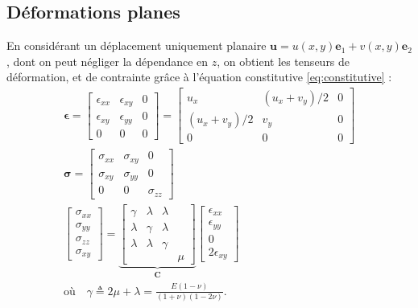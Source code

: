 \documentclass[12pt]{article}
\newcommand{\uu}{\mathbf{u}}
\newcommand{\stress}{\boldsymbol{\sigma}}
\newcommand{\strain}{\boldsymbol{\epsilon}}
\begin{document}
\subsection{Déformations planes}
En considérant un déplacement uniquement planaire $\uu = u(x,y)\mathbf{e}_1 
+ v(x,y)\mathbf{e}_2$, dont on peut négliger la dépendance en $z$, on obtient 
les tenseurs de déformation, et de contrainte grâce à l'équation constitutive 
\eqref{eq:constitutive} :
\begin{gather}
    \strain =
    \begin{bmatrix}
        \epsilon_{xx} & \epsilon_{xy} & 0\\
        \epsilon_{xy} & \epsilon_{yy} & 0\\
        0 & 0 & 0
    \end{bmatrix} 
    =
    \begin{bmatrix}
        u_x & (u_x+v_y)/2 & 0\\
        (u_x+v_y)/2 & v_y & 0\\
        0 & 0 & 0
    \end{bmatrix} \label{eq:planeStrainStrain}
    \\[1em]
    \stress =
    \begin{bmatrix}
        \sigma_{xx} & \sigma_{xy} & 0\\
        \sigma_{xy} & \sigma_{yy} & 0\\
        0 & 0 & \sigma_{zz}
    \end{bmatrix}\\[1em]
    \begin{bmatrix}
        \sigma_{xx}\\
        \sigma_{yy}\\
        \sigma_{zz}\\
        \sigma_{xy}
    \end{bmatrix} = 
    \underbrace{
    \begin{bmatrix}
        \gamma & \lambda & \lambda & \\
        \lambda & \gamma & \lambda & \\
        \lambda & \lambda & \gamma & \\
         &  &  & \mu
    \end{bmatrix}}_{\mathbf{C}}
    \begin{bmatrix}
        \epsilon_{xx}\\
        \epsilon_{yy}\\[3pt]
        0\\
        2\epsilon_{xy}
    \end{bmatrix}\\[1em]
    \text{où} \quad
    \gamma \triangleq 2\mu + \lambda = 
    \frac{E(1 - \nu)}{(1 + \nu)(1 - 2\nu)}.
\end{gather}
\end{document}
